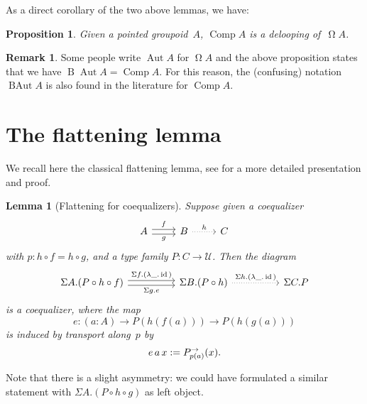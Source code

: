 \documentclass[10pt,a4paper]{amsart}
\newtheorem{proposition}[theorem]{Proposition}
\newtheorem{lemma}[theorem]{Lemma}
\theoremstyle{definition}
\newtheorem{remark}[theorem]{Remark}
\newcommand{\id}{\operatorname{id}} %
\newcommand{\B}{\operatorname{B}} %
\newcommand{\defd}{:=} %
\newcommand{\subst}[2]{#1^\to_{#2}} %
\newcommand{\happly}[2]{#1(#2)} %
\newcommand{\Aut}{\operatorname{Aut}} %
\newcommand{\Comp}{\operatorname{Comp}} %
\newcommand{\Loop}{\operatorname{\Omega}} %
\newcommand{\U}{\mathcal{U}} %
\begin{document}
\noindent
As a direct corollary of the two above lemmas, we have:

\begin{proposition}
  \label{B-loop}
  Given a pointed groupoid~$A$, $\Comp A$ is a delooping of~$\Loop A$.
\end{proposition}

\begin{remark}
  Some people write $\Aut A$ for $\Loop A$ and the above proposition states that
  we have $\B\Aut A=\Comp A$. For this reason, the (confusing) notation
  $\operatorname{BAut}A$ is also found in the literature for $\Comp A$.
\end{remark}




\section{The flattening lemma}
We recall here the classical flattening lemma, see \cite[Section~6.12]{hottbook}
for a more detailed presentation and proof.

\begin{lemma}[Flattening for coequalizers]
  \label{flattening-coequalizers}
  Suppose given a coequalizer
  \[
    \begin{tikzcd}
      A\ar[r,shift left,"f"]\ar[r,shift right,"g"']&B\ar[r,dotted,"h"]&C
    \end{tikzcd}
  \]
  with $p:h\circ f=h\circ g$, and a type family $P:C\to\U$. Then the diagram
  \[
    \begin{tikzcd}[sep=huge]
      \Sigma A.(P\circ h\circ f)\ar[r,shift left,"\Sigma f.(\lambda\_.\id{})"]\ar[r,shift right,"\Sigma g.e"']&\Sigma B.(P\circ h)\ar[r,dotted,"\Sigma h.(\lambda\_.\id{})"]&\Sigma C.P
    \end{tikzcd}
  \]
  is a coequalizer, where the map
  \[
    e:(a:A)\to P(h(f(a)))\to P(h(g(a)))
  \]
  is induced by transport along~$p$ by
  \[
    e\,a\,x\defd
    \subst{P}{\happly pa}(x)
    \text.
  \]
\end{lemma}

\noindent
Note that there is a slight asymmetry: we could have formulated a similar
statement with $\Sigma A.(P\circ h\circ g)$ as left object.

% 
\end{document}
